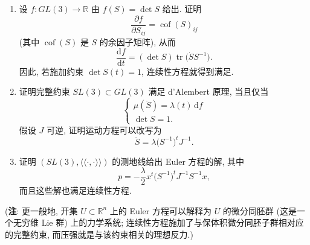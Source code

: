 \begin{RiemannExercise}
\begin{enumerate}[label=(\arabic*),ref=\arabic*,leftmargin=*]
\begin{enumerate}[label=(\alph*),leftmargin=*]
给定测地线 $S:\mathbb{R}\to GL(3)$, 定义
\[
  \begin{aligned}
    x(t,\xi)&=S(t)\xi,\\
    u(t,x)&=\dot S(t)\xi=\dot S(t)S^{-1}(t)x.
  \end{aligned}
\]
证明速度场 $u$ 满足 Euler 方程 (取 $p=0$), 但不满足连续性方程.
\item 设 $f:GL(3)\to\mathbb{R}$ 由 $f(S)=\det S$ 给出. 证明
\[
  \frac{\partial f}{\partial S_{ij}}=\operatorname{cof}(S)_{ij}
\]
(其中 $\operatorname{cof}(S)$ 是 $S$ 的余因子矩阵), 从而
\[
  \frac{\mathrm{d}f}{\mathrm{d}t}=(\det S)\operatorname{tr}\bigl(\dot S S^{-1}\bigr).
\]
因此, 若施加约束 $\det S(t)=1$, 连续性方程就得到满足.
\item 证明完整约束 $SL(3)\subset GL(3)$ 满足 d’Alembert 原理, 当且仅当
\[
  \begin{cases}
    \mu(\ddot S)=\lambda(t)\,\mathrm{d}f\\
    \det S=1.
  \end{cases}
\]
假设 $J$ 可逆, 证明运动方程可以改写为
\[
  \ddot S=\lambda\bigl(S^{-1}\bigr)^tJ^{-1}.
\]
\item 证明 $(SL(3),\langle\!\langle\cdot,\cdot\rangle\!\rangle)$ 的测地线给出 Euler 方程的解, 其中
\[
  p=-\frac{\lambda}{2}x^t\bigl(S^{-1}\bigr)^tJ^{-1}S^{-1}x,
\]
而且这些解也满足连续性方程.
\end{enumerate}
(\textbf{注}: 更一般地, 开集 $U\subset\mathbb{R}^n$ 上的 Euler 方程可以解释为 $U$ 的微分同胚群 (这是一个无穷维 Lie 群) 上的力学系统; 连续性方程施加了与保体积微分同胚子群相对应的完整约束, 而压强就是与该约束相关的理想反力.)
\end{enumerate}
\end{RiemannExercise}
